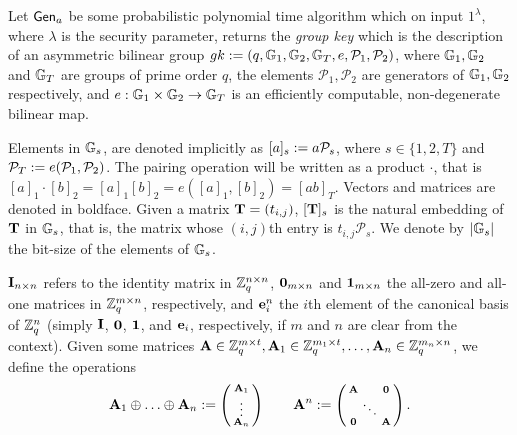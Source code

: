 Let $\mathsf{Gen}_a$ be some probabilistic polynomial time algorithm which on input $1^{\lambda}$, where $\lambda$ is the security parameter, returns the \emph{group key} which is the description of an asymmetric bilinear group $gk:=(q,\mathbb{G}_1,\mathbb{G}_2,\mathbb{G}_T,e,\mathcal{P}_1,\mathcal{P}_2)$, where $\mathbb{G}_1,\mathbb{G}_2$
and $\mathbb{G}_T$ are groups of prime order $q$, the elements $\mathcal{P}_1, \mathcal{P}_2$ are generators of 
$\mathbb{G}_1,\mathbb{G}_2$ respectively, and $e:\mathbb{G}_1\times\mathbb{G}_2\to\mathbb{G}_T$ is an efficiently
computable, non-degenerate bilinear map. 

Elements in $\mathbb{G}_s$, are denoted implicitly as $[a]_s:=a \mathcal{P}_s$, where $s \in \{1,2,T\}$ and $\mathcal{P}_T:=e(\mathcal{P}_1,\mathcal{P}_2)$. 
The pairing operation will be written as a product $\cdot$, that is $[a]_1 \cdot [b]_2=[a]_1 [b]_2=e([a]_1,[b]_2)=[ab]_T$. Vectors and matrices are denoted in boldface. Given a matrix $\mathbf{{T}}=(t_{i,j})$, $[\mathbf{{T}}]_s$ is
the natural embedding of $\mathbf{{T}}$ in $\mathbb{G}_s$, that is, the matrix whose $(i,j)$th entry
is $t_{i,j}\mathcal{P}_s$. We denote by $|\mathbb{G}_s|$ the bit-size of the elements of $\mathbb{G}_s$.

$\mathbf{{I}}_{n\times n}$ refers to the identity matrix in $\mathbb{Z}_q^{n\times n}$, $\mathbf{{0}}_{m\times n}$ and $\mathbf{{1}}_{m\times n}$ the all-zero and all-one matrices in $\mathbb{Z}_q^{m\times n}$, respectively, and $\mathbf{e}^{n}_i$ the $i$th element 
of the canonical basis of $\mathbb{Z}_q^{n}$ (simply $\mathbf{{I}}$, $\mathbf{{0}}$, $\mathbf{{1}}$, and $\mathbf{e}_i$, respectively, if $m$ and $n$ are clear from the context). 
Given some matrices $\mathbf{{A}}\in\mathbb{Z}_q^{m\times t},\mathbf{{A}}_1\in\mathbb{Z}_q^{m_1\times t},\ldots,\mathbf{{A}}_n\in\mathbb{Z}_q^{m_n\times n}$, we define the operations $$\mathbf{A}_1 \oplus \ldots \oplus \mathbf{A}_n:=\left(\begin{smallmatrix} \mathbf{A}_1 \\ \vdots \\  \mathbf{A}_n\end{smallmatrix}\right) \qquad 
\mathbf{{A}}^n:=\left(\begin{smallmatrix} \mathbf{{A}} &  & \mathbf{{0}} \\   & \ddots &   \\ \mathbf{{0}} &  & \mathbf{{A}}
\end{smallmatrix}\right).$$ 



